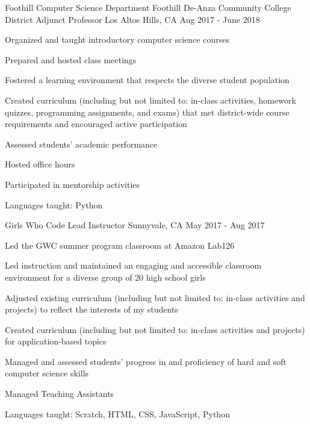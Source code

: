 \begin{cventries}
  \cventry
{Foothill Computer Science Department \newline Foothill De-Anza Community College District}
    {Adjunct Professor}
    {Los Altos Hills, CA}
    {Aug 2017 - June 2018}
    {
      \begin{cvitems}
	\item {Organized and taught introductory computer science courses}\\
	\begin{cvitems}
         \item Prepared and hosted class meetings
                  \item Fostered a learning environment that respects the diverse student population
		\item Created curriculum (including but not limited to: in-class activities, homework quizzes, programming assignments, and exams) that met district-wide course requirements and encouraged active participation
		\item Assessed students' academic performance
		\item Hosted office hours
	\end{cvitems}
	\vspace{2mm}
	\item Participated in mentorship activities
	\item Languages taught: Python
      \end{cvitems}
    }

  \cventry
{Girls Who Code}
    {Lead Instructor}
    {Sunnyvale, CA}
    {May 2017 - Aug 2017}
    {
      \begin{cvitems}
	\item {Led the GWC summer program classroom at Amazon Lab126}\\
	\begin{cvitems}
        \item Led instruction and maintained an engaging and accessible classroom environment for a diverse group of 20 high school girls
         \item Adjusted existing curriculum (including but not limited to: in-class activities and projects) to reflect the interests of my students
         \item Created curriculum (including but not limited to: in-class activities and projects) for application-based topics
	\item Managed and assessed students’ progress in and proficiency of hard and soft computer science skills
	\item Managed Teaching Assistants
	\end{cvitems}
	\vspace{2mm}
	\item Languages taught: Scratch, HTML, CSS, JavaScript, Python
      \end{cvitems}
    }


\end{cventries}
